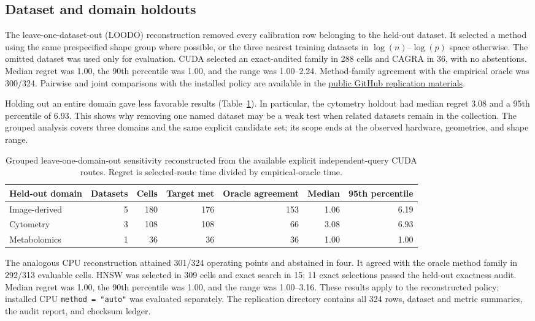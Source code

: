 \documentclass[11pt]{article}
\newcommand{\code}[1]{\texttt{#1}}
\begin{document}
\subsection{Dataset and domain holdouts}

The leave-one-dataset-out (LOODO) reconstruction removed every calibration
row belonging to the held-out dataset. It selected a method using the same
prespecified shape group where possible, or the three nearest training
datasets in $\log(n)$--$\log(p)$ space otherwise. The omitted dataset was
used only for evaluation. CUDA selected an exact-audited family in 288 cells
and CAGRA in 36, with no abstentions. Median regret was 1.00, the 90th
percentile was 1.00, and the range was 1.00--2.24. Method-family agreement
with the empirical oracle was 300/324. Pairwise and joint comparisons with
the installed policy are available in the
\href{https://github.com/tkcaccia/faissR/tree/main/manuscript/jss}{public
GitHub replication materials}.

Holding out an entire domain gave less favorable results
(Table~\ref{tab:supp-domain-holdout}). In particular, the cytometry holdout
had median regret 3.08 and a 95th percentile of 6.93. This shows why removing
one named dataset may be a weak test when related datasets remain in the
collection. The grouped analysis covers three domains and the same explicit
candidate set; its scope ends at the observed hardware, geometries, and shape
range.

\begin{table}[ht]
\centering
\small

\begin{tabular}{@{}lrrrrrr@{}}
\toprule
Held-out domain & Datasets & Cells & Target met & Oracle agreement & Median & 95th percentile \\
\midrule
Image-derived & 5 & 180 & 176 & 153 & 1.06 & 6.19 \\
Cytometry & 3 & 108 & 108 & 66 & 3.08 & 6.93 \\
Metabolomics & 1 & 36 & 36 & 36 & 1.00 & 1.00 \\
\bottomrule
\end{tabular}
\caption{Grouped leave-one-domain-out sensitivity reconstructed from the
available explicit independent-query CUDA routes. Regret is selected-route time divided
by empirical-oracle time.}
\label{tab:supp-domain-holdout}
\end{table}

The analogous CPU reconstruction attained 301/324 operating points and
abstained in four. It agreed with the oracle method family in 292/313
evaluable cells. HNSW was selected in 309 cells and exact search in 15;
11 exact selections passed the held-out exactness audit. Median regret was
1.00, the 90th percentile was 1.00, and the range was 1.00--3.16.
These results apply to the reconstructed policy; installed CPU
\code{method = "auto"} was evaluated separately. The replication directory
 contains all 324
rows, dataset and metric summaries, the audit report, and checksum ledger.
\end{document}

